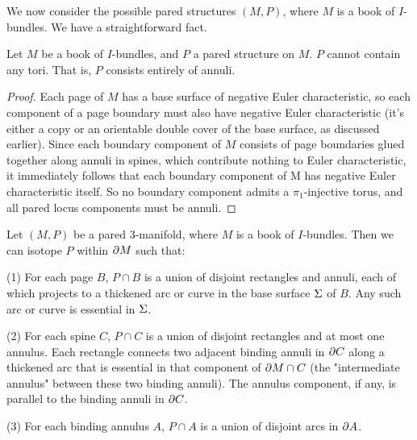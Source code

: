 We now consider the possible pared structures $(M,P)$, where $M$ is a book of
$I$-bundles. We have a straightforward fact.

\begin{prop}\label{P:annuli}

Let $M$ be a book of $I$-bundles, and $P$ a pared structure on $M$. $P$ cannot
contain any tori.  That is, $P$ consists entirely of annuli.

\end{prop}

\begin{proof}

Each page of $M$ has a base surface of negative Euler characteristic, so each
component of a page boundary must also have negative Euler characteristic (it's
either a copy or an orientable double cover of the base surface, as discussed
earlier). Since each boundary component of $M$ consists of page boundaries
glued together along annuli in spines, which contribute nothing to Euler
characteristic, it immediately follows that each boundary component of M has
negative Euler characteristic itself. So no boundary component admits
a $\pi_1$-injective torus, and all pared locus components must be annuli.

\end{proof}

\begin{lemma}

Let $(M,P)$ be a pared $3$-manifold, where $M$ is a book of $I$-bundles. Then we
can isotope $P$ within $\partial M$ such that:

(1) For each page $B$, $P \cap B$ is a union of disjoint rectangles and annuli,
each of which projects to a thickened arc or curve in the base surface $\Sigma$ of
$B$.  Any such arc or curve is essential in $\Sigma$.

(2) For each spine $C$, $P \cap C$ is a union of disjoint rectangles and at
most one annulus.  Each rectangle connects two adjacent binding annuli in $\partial
C$ along a thickened arc that is essential in that component of $\partial M \cap C$
(the "intermediate annulus" between these two binding annuli). The annulus
component, if any, is parallel to the binding annuli in $\partial C$.

(3) For each binding annulus $A$, $P \cap A$ is a union of disjoint arcs in
$\partial A$.

\end{lemma}

